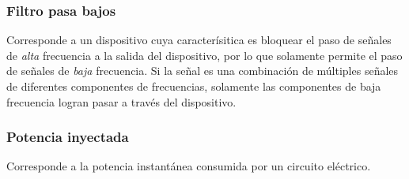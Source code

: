\documentclass[11pt,letterpaper]{article}
\begin{document}
\subsubsection{Filtro pasa bajos}
Corresponde a un dispositivo cuya caracterísitica es bloquear el paso de señales de \textit{alta} frecuencia a la salida del dispositivo, por lo que solamente permite el paso de señales de \textit{baja} frecuencia. Si la señal es una combinación de múltiples señales de diferentes componentes de frecuencias, solamente las componentes de baja frecuencia logran pasar a trav\'es del dispositivo. 

\subsubsection{Potencia inyectada}
Corresponde a la potencia instantánea consumida por un circuito el\'ectrico.
\end{document}
